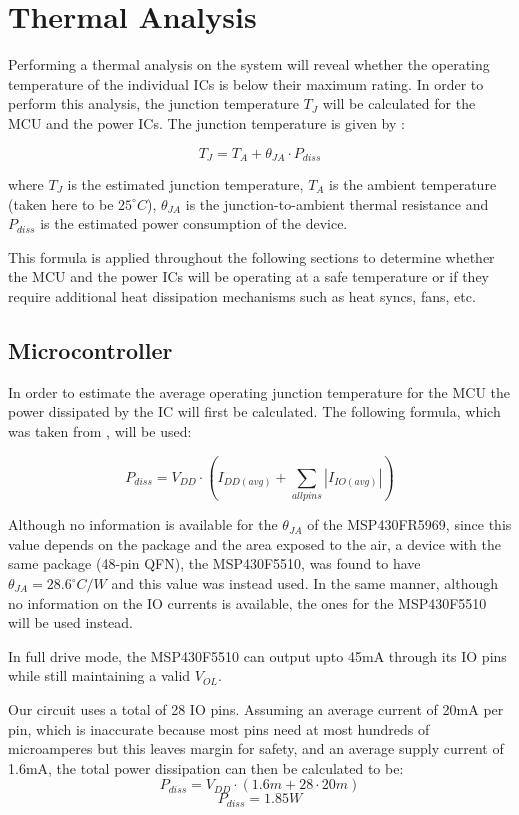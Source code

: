 \documentclass[12pt,letterpaper]{article}
\begin{document}
%

\section{Thermal Analysis}
Performing a thermal analysis on the system will reveal whether the operating temperature of the individual ICs is below their maximum rating.  In order to perform this analysis, the junction temperature $T_J$ will be calculated for the MCU and the power ICs.  The junction temperature is given by \cite[419]{Jimenez2013}:

\[T_J = T_A + \theta_{JA} \cdot P_{diss}\]

where $T_J$ is the estimated junction temperature, $T_A$ is the ambient temperature (taken here to be $25^\circ C$), $\theta_{JA}$ is the junction-to-ambient thermal resistance and $P_{diss}$ is the estimated power consumption of the device. 

This formula is applied throughout the following sections to determine whether the MCU and the power ICs will be operating at a safe temperature or if they require additional heat dissipation mechanisms such as heat syncs, fans, etc.

\subsection{Microcontroller}
In order to estimate the average operating junction temperature for the MCU the power dissipated by the IC will first be calculated.  The following formula, which was taken from \cite[419]{Jimenez2013}, will be used:

\[P_{diss} = V_{DD} \cdot \left(I_{DD(avg)} + \sum_{allpins} |I_{IO(avg)}| \right)\]

Although no information is available for the $\theta_{JA}$ of the MSP430FR5969, since this value depends on the package and the area exposed to the air, a device with the same package (48-pin QFN), the MSP430F5510, was found to have $\theta_{JA} = 28.6^\circ C/W$ and this value was instead used.  In the same manner, although no information on the IO currents is available, the ones for the MSP430F5510 will be used instead.

In full drive mode, the MSP430F5510 can output upto 45mA through its IO pins while still maintaining a valid $V_{OL}$.  

Our circuit uses a total of 28 IO pins.  Assuming an average current of 20mA per pin, which is inaccurate because most pins need at most hundreds of microamperes but this leaves margin for safety, and an average supply current of 1.6mA, the total power dissipation can then be calculated to be:
\[P_{diss} = V_{DD} \cdot \left(1.6m + 28 \cdot 20m \right)\]
\[\boxed{P_{diss} = 1.85W}\]
\end{document}

